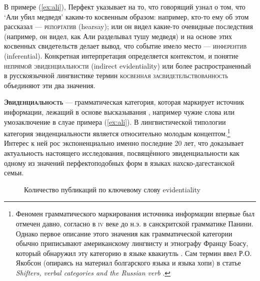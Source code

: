 В примере (\ref{ex:ali}), Перфект указывает на то, что говорящий узнал о том, что `Али убил медведя' каким-то косвенным образом: например, кто-то ему об этом рассказал --- \textsc{репортатив} (hearsay); или он видел какие-то очевидные последствия (например, он видел, как Али разделывал тушу медведя) и на основе этих косвенных свидетельств делает вывод, что событие имело место --- \textsc{инферентив} (inferential). Конкретная интерпретация определяется контекстом, и понятие \textsc{непрямой эвиденциальности} (indirect evidentiality) или более распространенный в русскоязычной лингвистике термин \textsc{косвенная засвидетельствованность} объединяют эти два значения. 

\par \textsc{\textbf{Эвиденциальность}} --- грамматическая категория, которая маркирует источник информации, лежащий в основе высказывания \citep[1]{aikhenvald2018}, например чужие слова или умозаключение в слуае примера (\ref{ex:ali}). В лингвистической типологии категория эвиденциальности является относительно молодым концептом.\footnote{Феномен грамматического маркирования источника информации впервые был отмечен давно, согласно \citep[125]{friedman2018} в \textsc{iv} веке до н.э. в санскритской грамматике Панини. Однако первое описание этого значения как грамматической категории обычно приписывают американскому лингвисту и этнографу Францу Боасу, который обнаружил эту категорию в языке квакиутль \citep[12]{aikhenvald2004}. Сам термин ввел Р.О. Якобсон (опираясь на материал болгарского языка и языка хопи) в статье \textit{Shifters, verbal categories and the Russian verb} \citep[41--58]{jakobson1957}.} Интерес к ней рос экспоненциально именно последние 20 лет, что доказывает актуальность настоящего исследования, посвящённого эвиденциальности как одному из значений перфектоподобных форм в языках нахско-дагестанской семьи.

\begin{figure}[H]
\centering
\caption{Количество публикаций по ключевому слову evidentiality}
\label{fig:evpubs}
\vspace{0.5cm}
\end{figure}


